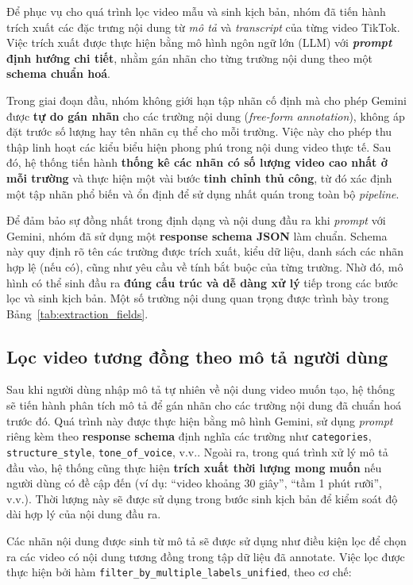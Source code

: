 Để phục vụ cho quá trình lọc video mẫu và sinh kịch bản, nhóm đã tiến hành trích xuất các đặc trưng nội dung từ \textit{mô tả} và \textit{transcript} của từng video TikTok. Việc trích xuất được thực hiện bằng mô hình ngôn ngữ lớn (LLM) với \textbf{\textit{prompt} định hướng chi tiết}, nhằm gán nhãn cho từng trường nội dung theo một \textbf{schema chuẩn hoá}.

Trong giai đoạn đầu, nhóm không giới hạn tập nhãn cố định mà cho phép Gemini được \textbf{tự do gán nhãn} cho các trường nội dung (\textit{free-form annotation}), không áp đặt trước số lượng hay tên nhãn cụ thể cho mỗi trường. Việc này cho phép thu thập linh hoạt các kiểu biểu hiện phong phú trong nội dung video thực tế. Sau đó, hệ thống tiến hành \textbf{thống kê các nhãn có số lượng video cao nhất ở mỗi trường} và thực hiện một vài bước \textbf{tinh chỉnh thủ công}, từ đó xác định một tập nhãn phổ biến và ổn định để sử dụng nhất quán trong toàn bộ \textit{pipeline}.

Để đảm bảo sự đồng nhất trong định dạng và nội dung đầu ra khi \textit{prompt} với Gemini, nhóm đã sử dụng một \textbf{response schema JSON} làm chuẩn. Schema này quy định rõ tên các trường được trích xuất, kiểu dữ liệu, danh sách các nhãn hợp lệ (nếu có), cũng như yêu cầu về tính bắt buộc của từng trường. Nhờ đó, mô hình có thể sinh đầu ra \textbf{đúng cấu trúc và dễ dàng xử lý} tiếp trong các bước lọc và sinh kịch bản. Một số trường nội dung quan trọng được trình bày trong Bảng~\ref{tab:extraction_fields}.

\subsection{Lọc video tương đồng theo mô tả người dùng}

Sau khi người dùng nhập mô tả tự nhiên về nội dung video muốn tạo, hệ thống sẽ tiến hành phân tích mô tả để gán nhãn cho các trường nội dung đã chuẩn hoá trước đó. Quá trình này được thực hiện bằng mô hình Gemini, sử dụng \textit{prompt} riêng kèm theo \textbf{response schema} định nghĩa các trường như \texttt{categories}, \texttt{structure\_style}, \texttt{tone\_of\_voice}, v.v.. Ngoài ra, trong quá trình xử lý mô tả đầu vào, hệ thống cũng thực hiện \textbf{trích xuất thời lượng mong muốn} nếu người dùng có đề cập đến (ví dụ: ``video khoảng 30 giây'', ``tầm 1 phút rưỡi'', v.v.). Thời lượng này sẽ được sử dụng trong bước sinh kịch bản để kiểm soát độ dài hợp lý của nội dung đầu ra.

Các nhãn nội dung được sinh từ mô tả sẽ được sử dụng như điều kiện lọc để chọn ra các video có nội dung tương đồng trong tập dữ liệu đã annotate. Việc lọc được thực hiện bởi hàm \texttt{filter\allowbreak\_by\allowbreak\_multiple\allowbreak\_labels\allowbreak\_unified}, theo cơ chế:

